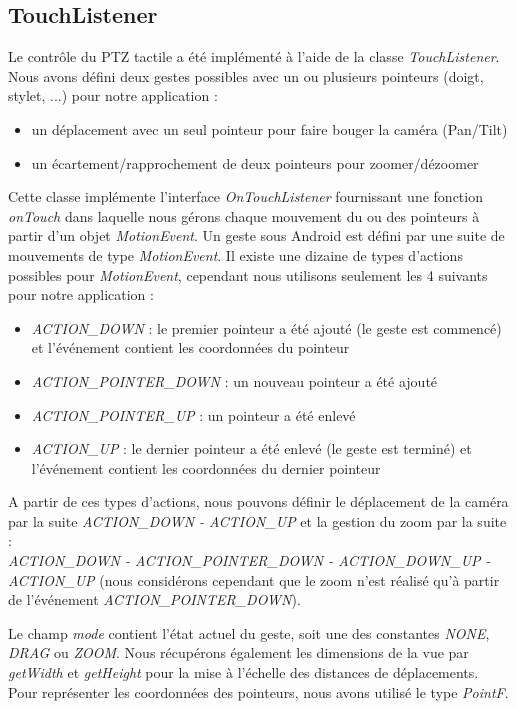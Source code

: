 \subsection{TouchListener}
Le contrôle du PTZ tactile a été implémenté à l'aide de la classe \textit{TouchListener}. Nous avons défini deux gestes possibles avec un ou plusieurs pointeurs (doigt, stylet, ...) pour notre application :
\begin{itemize}
\item un déplacement avec un seul pointeur pour faire bouger la caméra (Pan/Tilt)
\item un écartement/rapprochement de deux pointeurs pour zoomer/dézoomer
\end{itemize}
Cette classe implémente l'interface \textit{OnTouchListener} fournissant une fonction \textit{onTouch} dans laquelle nous gérons chaque mouvement du ou des pointeurs à partir d'un objet \textit{MotionEvent}. Un geste sous Android est défini par une suite de mouvements de type \textit{MotionEvent}.
Il existe une dizaine de types d'actions possibles pour \textit{MotionEvent}, cependant nous utilisons seulement les 4 suivants pour notre application :
\begin{itemize}
\item \textit{ACTION\_DOWN} : le premier pointeur a été ajouté (le geste est
commencé) et l'événement contient les coordonnées du pointeur
\item \textit{ACTION\_POINTER\_DOWN} : un nouveau pointeur a été ajouté
\item \textit{ACTION\_POINTER\_UP} : un pointeur a été enlevé
\item \textit{ACTION\_UP} : le dernier pointeur a été enlevé (le geste est
terminé) et l'événement contient les coordonnées du dernier pointeur
\end{itemize}
A partir de ces types d'actions, nous pouvons définir le déplacement de la
caméra par la suite \textit{ACTION\_DOWN - ACTION\_UP} et la gestion du zoom par
la suite : \\ \textit{ACTION\_DOWN - ACTION\_POINTER\_DOWN - ACTION\_DOWN\_UP -
ACTION\_UP} (nous considérons cependant que le zoom n'est réalisé qu'à partir de l'événement
\textit{ACTION\_POINTER\_DOWN}).

Le champ \textit{mode} contient l'état actuel du geste, soit une des constantes \textit{NONE}, \textit{DRAG} ou \textit{ZOOM}.
Nous récupérons également les dimensions de la vue par \textit{getWidth} et \textit{getHeight} pour la mise à l'échelle des distances de déplacements. 
Pour représenter les coordonnées des pointeurs, nous avons utilisé le type \textit{PointF}.

